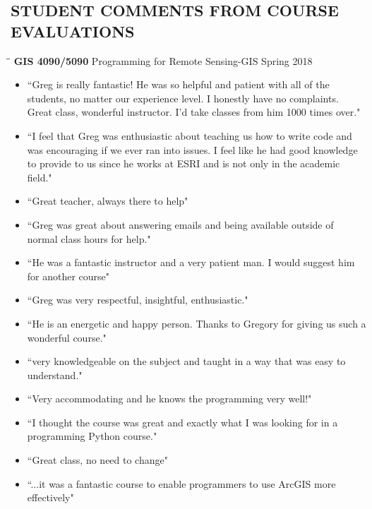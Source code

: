 \documentclass{res}
\begin{document}
\begin{resume}
 
\section{STUDENT COMMENTS FROM COURSE EVALUATIONS}
   \vspace{-0.1in}	

\begin{tabbing}
	\hspace{2.3in}\= \hspace{2.6in}\= \kill %
	{\bf GIS 4090/5090} \>Programming for Remote Sensing-GIS     \>Spring 2018\\
	\>
\end{tabbing}\vspace{-20pt}      %
\begin{itemize}  
\item``Greg is really fantastic! He was so helpful and patient with all of the students, no matter our experience level. I honestly have no complaints. Great class, wonderful instructor. I'd take classes from him 1000 times over."
\item``I feel that Greg was enthusiastic about teaching us how to write code and was encouraging if we ever ran into issues. I feel like he had good knowledge to provide to us since he works at ESRI and is not only in the academic field."
\item``Great teacher, always there to help"
\item``Greg was great about answering emails and being available outside of normal class hours for help."
\item``He was a fantastic instructor and a very patient man. I would suggest him for another course"
\item``Greg was very respectful, insightful, enthusiastic."
\item``He is an energetic and happy person. Thanks to Gregory for giving us such a wonderful course."
\item``very knowledgeable on the subject and taught in a way that was easy to understand."
\item``Very accommodating and he knows the programming very well!"
\item``I thought the course was great and exactly what I was looking for in a programming Python course."
\item``Great class, no need to change"
\item``...it was a fantastic course to enable programmers to use ArcGIS more effectively"

\end{itemize}
\end{resume}
\end{document}
